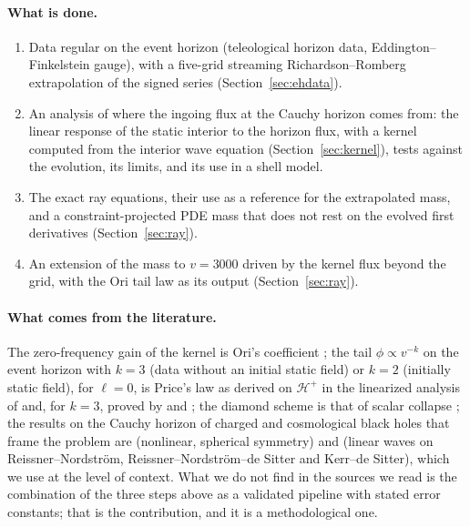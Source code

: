 \documentclass[11pt]{article}
\begin{document}
\paragraph{What is done.}
\begin{enumerate}
\item Data regular on the event horizon (teleological horizon data, Eddington--Finkelstein gauge), with a five-grid streaming Richardson--Romberg extrapolation of the signed series (Section~\ref{sec:ehdata}).
\item An analysis of where the ingoing flux at the Cauchy horizon comes from: the linear response of the static interior to the horizon flux, with a kernel computed from the interior wave equation (Section~\ref{sec:kernel}), tests against the evolution, its limits, and its use in a shell model.
\item The exact ray equations, their use as a reference for the extrapolated mass, and a constraint-projected PDE mass that does not rest on the evolved first derivatives (Section~\ref{sec:ray}).
\item An extension of the mass to $v=3000$ driven by the kernel flux beyond the grid, with the Ori tail law as its output (Section~\ref{sec:ray}).
\end{enumerate}

\paragraph{What comes from the literature.} The zero-frequency gain of the kernel is Ori's coefficient \citep{Ori1998}; the tail $\phi\propto v^{-k}$ on the event horizon with $k=3$ (data without an initial static field) or $k=2$ (initially static field), for $\ell=0$, is Price's law \citep{Price1972} as derived on $\mathcal H^+$ in the linearized analysis of \citet{GundlachPricePullin1994a} and, for $k=3$, proved by \citet{DafermosRodnianski2005} and \citet{AngelopoulosAretakisGajic2018}; the diamond scheme is that of scalar collapse \citep{GundlachPricePullin1994}; the results on the Cauchy horizon of charged and cosmological black holes that frame the problem are \citet{Dafermos2005} (nonlinear, spherical symmetry) and \citet{LukOh2017,HintzVasy2017,CostaFranzen2017,KehleShlapentokhRothman2019} (linear waves on Reissner--Nordstr\"om, Reissner--Nordstr\"om--de Sitter and Kerr--de Sitter), which we use at the level of context. What we do not find in the sources we read is the combination of the three steps above as a validated pipeline with stated error constants; that is the contribution, and it is a methodological one.
\end{document}
